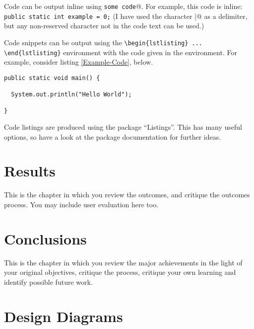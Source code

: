 \documentclass[11pt,openright,twoside,a4paper]{report}
\begin{document}
Code can be output inline using \verb@\lstinline|some code|@.  For example,
this code is inline: \lstinline|public static int example = 0;|  (I have
used the character \verb@|@ as a delimiter, but any non-reserved character
not in the code text can be used.)

Code snippets can be output using the \verb|\begin{lstlisting} ... \end{lstlisting}|
environment with the code given in the environment.  For
example, consider listing \ref{Example-Code}, below.

\begin{lstlisting}[breaklines,breakatwhitespace,caption={Example code},label=Example-Code]
public static void main() {

  System.out.println("Hello World");

}
\end{lstlisting}

Code listings are produced using the package ``Listings''.  This has many
useful options, so have a look at the package documentation for further
ideas.


\chapter{Results}
This is the chapter in which you review the outcomes, and
critique the outcomes process.  You may include user evaluation here
too.



\chapter{Conclusions}
%

This is the chapter in which you review the major achievements in the
light of your original objectives, critique the process, critique your
own learning and identify possible future work.





\appendix


\chapter{Design Diagrams}
\end{document}
